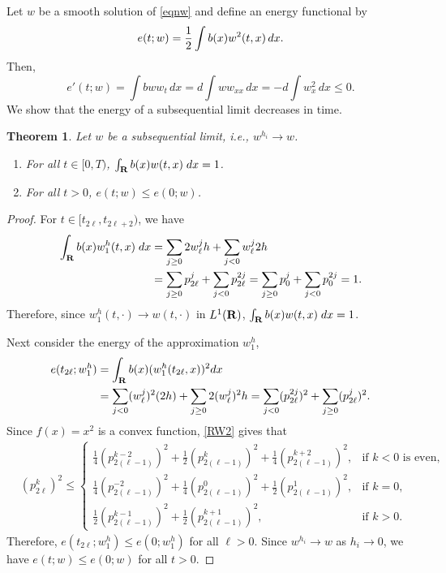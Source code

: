 \documentclass[11pt]{amsart}
\def\R{{\bf R}}
\def\R{{\bf R}}
\newtheorem{theorem}{Theorem}[section]
\begin{document}
Let $w$ be a smooth solution of \eqref{eqnw} and define an energy
functional by
$$
e(t;w)={1\over 2}\int  b(x) w^2(t,x)\,dx.
$$
Then,
$$
e'(t;w)=\int  b ww_t\,dx=d\int ww_{xx}\,dx=-d\int w_x^2\,dx\le 0.
$$
We show that the energy of a subsequential limit decreases in time.
\begin{theorem}
Let $w$ be a subsequential limit, i.e., $w^{h_i}\to w$.
\begin{enumerate}
 \item For all $t\in[0,T)$, $\int_\R b(x) w(t,x)\;dx = 1$.
 \item For all $t>0$, $e(t;w)\le e(0;w)$.
\end{enumerate}
\end{theorem}
\begin{proof}
For $t\in [t_{2\ell}, t_{2\ell+2})$, we have
\begin{align*}
\int_\R  b(x)w_1^h(t,x) \; dx &= \sum_{j\ge0}2w^j_\ell h +
\sum_{j<0}w^j_\ell2h \\
&=\sum_{j\ge0}p^j_{2\ell} +
\sum_{j<0}p^{2j}_{2\ell}=\sum_{j\ge0}p^j_{0} +
\sum_{j<0}p^{2j}_{0} = 1.
\end{align*}
Therefore, since $w_1^h(t,\cdot) \rightarrow w(t,\cdot)$ in $L^1(\R)$,
$\int_\R b(x) w(t,x) \; dx = 1$.

Next consider the energy of the approximation $w^h_1$,
\begin{align*}
e(t_{2\ell};w^h_1)&=\int_\R  b(x) (w^h_1(t_{2\ell},x))^2dx\\
&=\sum_{j<0}(w_\ell^{j})^2(2h) +\sum_{j\ge0}2(w_\ell^{j})^2h =\sum_{j<0}(p_{2\ell}^{2j})^2 +\sum_{j\ge0}(p_{2\ell}^{j})^2 .
\end{align*}
Since $f(x)=x^2$ is a convex function, \eqref{RW2} gives that
$$
\begin{aligned}
    &(p^{k}_{2\ell})^2 \le \left\{\begin{array}{ll}
        \frac{1}{4}(p^{k-2} _{2(\ell-1)})^2 + \frac{1}{2}(p^{k}_{2(\ell-1)})^2 +\frac{1}{4} (p^{k+2}_{2(\ell-1)})^2, & \text{if $k<0$ is even},\\
        \frac{1}{4}(p^{-2} _{2(\ell-1)})^2 + \frac{1}{4}(p^{0} _{2(\ell-1)})^2 +\frac{1}{2}(p ^{1} _{2(\ell-1)})^2, & \text{if $k=0$},\\
        \frac{1}{2}(p^{k-1} _{2(\ell-1)})^2 + \frac{1}{2}(p ^{k+1} _{2(\ell-1)})^2,
        & \text{if } k>0.
        \end{array}\right.
\end{aligned}
$$
Therefore, $e(t_{2\ell};w^h_1)\le e(0;w^h_1)$ for all $\ell>0$. Since $w^{h_i}\to w$ as $h_i\to0$, we have $e(t;w)\le e(0;w)$ for all $t>0$.
\end{proof}
\end{document}
